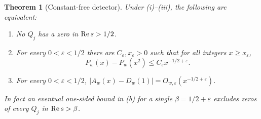 \documentclass[11pt]{article}
\newtheorem{theorem}{Theorem}[section]
\theoremstyle{remark}\newtheorem{remark}[theorem]{Remark}
\begin{document}
\begin{theorem}[Constant-free detector]\label{thm:detector}
Under (i)--(iii), the following are equivalent:
\begin{enumerate}[label=(\alph*)]
\item No $Q_j$ has a zero in $\operatorname{Re} s>1/2$.
\item For every $0<\varepsilon<1/2$ there are $C_\varepsilon,x_\varepsilon>0$ such that for all integers $x\ge x_\varepsilon$,
\begin{equation}\label{eq:criterion}
 P_w(x)-P_w(x^2)\le C_\varepsilon x^{-1/2+\varepsilon}.
\end{equation}
\item For every $0<\varepsilon<1/2$, $|A_w(x)-D_w(1)|=O_{w,\varepsilon}(x^{-1/2+\varepsilon})$.
\end{enumerate}
In fact an eventual one-sided bound in (b) for a single $\beta=1/2+\varepsilon$ excludes zeros of every $Q_j$ in $\operatorname{Re} s>\beta$.
\end{theorem}
\end{document}

